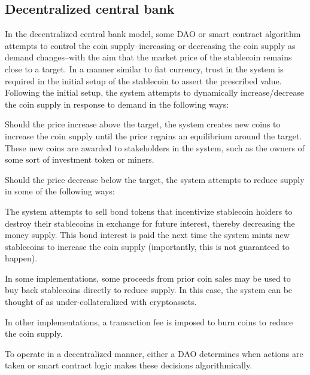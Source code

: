 \documentclass[10pt]{article}
\begin{document}
\subsection{Decentralized central bank}
In the decentralized central bank model, some DAO or smart contract algorithm attempts to control the coin supply--increasing or decreasing the coin supply as demand changes--with the aim that the market price of the stablecoin remains close to a target. In a manner similar to fiat currency, trust in the system is required in the initial setup of the stablecoin to assert the prescribed value. Following the initial setup, the system attempts to dynamically increase/decrease the coin supply in response to demand in the following ways:
\begin{compactitem}
	\item Should the price increase above the target, the system creates new coins to increase the coin supply until the price regains an equilibrium around the target. These new coins are awarded to stakeholders in the system, such as the owners of some sort of investment token or miners.
	\item Should the price decrease below the target, the system attempts to reduce supply in some of the following ways:
	\begin{compactitem}
		\item The system attempts to sell bond tokens that incentivize stablecoin holders to destroy their stablecoins in exchange for future interest, thereby decreasing the money supply. This bond interest is paid the next time the system mints new stablecoins to increase the coin supply (importantly, this is not guaranteed to happen).
		\item In some implementations, some proceeds from prior coin sales may be used to buy back stablecoins directly to reduce supply. In this case, the system can be thought of as under-collateralized with cryptoassets.
		\item In other implementations, a transaction fee is imposed to burn coins to reduce the coin supply.
	\end{compactitem}
\end{compactitem}
To operate in a decentralized manner, either a DAO determines when actions are taken or smart contract logic makes these decisions algorithmically.
\end{document}
